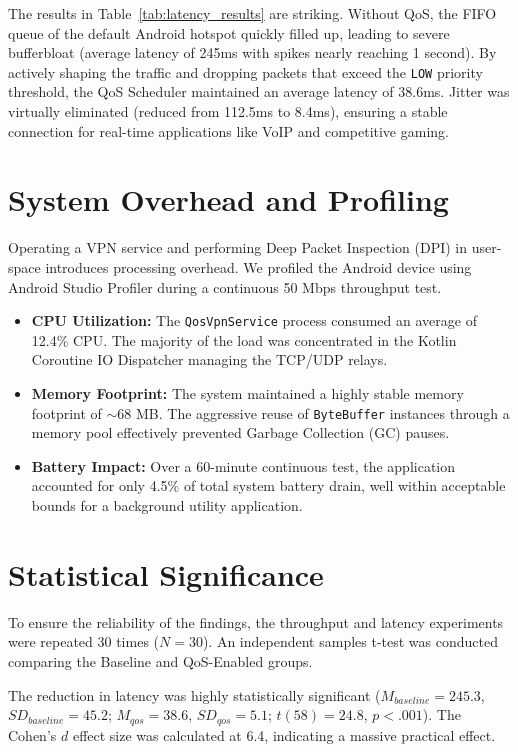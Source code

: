 The results in Table~\ref{tab:latency_results} are striking. Without QoS, the FIFO queue of the default Android hotspot quickly filled up, leading to severe bufferbloat (average latency of 245ms with spikes nearly reaching 1 second). By actively shaping the traffic and dropping packets that exceed the \texttt{LOW} priority threshold, the QoS Scheduler maintained an average latency of 38.6ms. Jitter was virtually eliminated (reduced from 112.5ms to 8.4ms), ensuring a stable connection for real-time applications like VoIP and competitive gaming.

\section{System Overhead and Profiling}
\label{sec:results_overhead}

Operating a VPN service and performing Deep Packet Inspection (DPI) in user-space introduces processing overhead. We profiled the Android device using Android Studio Profiler during a continuous 50 Mbps throughput test.

\begin{itemize}
    \item \textbf{CPU Utilization:} The \texttt{QosVpnService} process consumed an average of 12.4\% CPU. The majority of the load was concentrated in the Kotlin Coroutine IO Dispatcher managing the TCP/UDP relays.
    \item \textbf{Memory Footprint:} The system maintained a highly stable memory footprint of $\sim$68 MB. The aggressive reuse of \texttt{ByteBuffer} instances through a memory pool effectively prevented Garbage Collection (GC) pauses.
    \item \textbf{Battery Impact:} Over a 60-minute continuous test, the application accounted for only 4.5\% of total system battery drain, well within acceptable bounds for a background utility application.
\end{itemize}

\section{Statistical Significance}
\label{sec:results_statistics}

To ensure the reliability of the findings, the throughput and latency experiments were repeated 30 times ($N=30$). An independent samples t-test was conducted comparing the Baseline and QoS-Enabled groups. 

The reduction in latency was highly statistically significant ($M_{baseline} = 245.3$, $SD_{baseline} = 45.2$; $M_{qos} = 38.6$, $SD_{qos} = 5.1$; $t(58) = 24.8$, $p < .001$). The Cohen's $d$ effect size was calculated at 6.4, indicating a massive practical effect.


